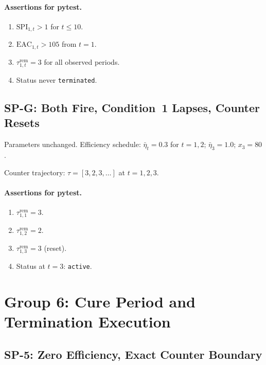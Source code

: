 \documentclass[11pt, a4paper]{article}
\newcommand{\EAC}{\mathrm{EAC}}
\newcommand{\SPI}{\mathrm{SPI}}
\begin{document}
\paragraph{Assertions for pytest.}
\begin{enumerate}[label=A\arabic*.]
  \item $\SPI_{1,t}>1$ for $t\leq10$.
  \item $\EAC_{1,t}>105$ from $t=1$.
  \item $\tau_{1,t}^{\mathrm{rem}}=3$ for all observed periods.
  \item Status never \texttt{terminated}.
\end{enumerate}

\subsection{SP-G: Both Fire, Condition~1 Lapses, Counter Resets}

Parameters unchanged. Efficiency schedule: $\bar\eta_t=0.3$ for
$t=1,2$; $\bar\eta_3=1.0$; $x_3=80$.

Counter trajectory: $\tau=[3,2,3,\ldots]$ at $t=1,2,3$.

\paragraph{Assertions for pytest.}
\begin{enumerate}[label=A\arabic*.]
  \item $\tau_{1,1}^{\mathrm{rem}}=3$.
  \item $\tau_{1,2}^{\mathrm{rem}}=2$.
  \item $\tau_{1,3}^{\mathrm{rem}}=3$ (reset).
  \item Status at $t=3$: \texttt{active}.
\end{enumerate}

\section{Group 6: Cure Period and Termination Execution}

\subsection{SP-5: Zero Efficiency, Exact Counter Boundary}
\end{document}
